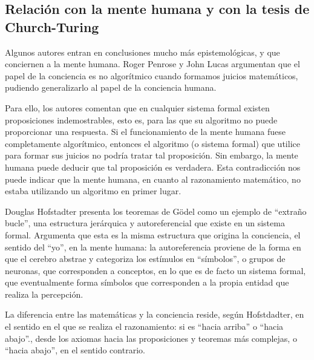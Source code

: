 
\subsection{Relación con la mente humana y con la tesis de Church-Turing}\label{subsec:mente-humana-tesis-church-turing}

Algunos autores entran en conclusiones mucho más epistemológicas, y que conciernen a la mente humana. Roger Penrose y John Lucas \cite{Penrose1989, Lucas1961} argumentan que el papel de la conciencia es no algorítmico cuando formamos juicios matemáticos, pudiendo generalizarlo al papel de la conciencia humana.

Para ello, los autores comentan que en cualquier sistema formal existen proposiciones indemostrables, esto es, para las que su algoritmo no puede proporcionar una respuesta. Si el funcionamiento de la mente humana fuese completamente algorítmico, entonces el algoritmo (o sistema formal) que utilice para formar sus juicios no podría tratar tal proposición. Sin embargo, la mente humana puede deducir que tal proposición es verdadera. Esta contradicción nos puede indicar que la mente humana, en cuanto al razonamiento matemático, no estaba utilizando un algoritmo en primer lugar.

Douglas Hofstadter \cite{Hofstadter1999, Hofstadter2007} presenta los teoremas de Gödel como un ejemplo de ``extraño bucle'', una estructura jerárquica y autoreferencial que existe en un sistema formal. Argumenta que esta es la misma estructura que origina la conciencia, el sentido del ``yo'', en la mente humana: la autoreferencia proviene de la forma en que el cerebro abstrae y categoriza los estímulos en ``símbolos'', o grupos de neuronas, que corresponden a conceptos, en lo que es de facto un sistema formal, que eventualmente forma símbolos que corresponden a la propia entidad que realiza la percepción. 

La diferencia entre las matemáticas y la conciencia reside, según Hofstdadter, en el sentido en el que se realiza el razonamiento: si es ``hacia arriba'' o ``hacia abajo''., desde los axiomas hacia las proposiciones y teoremas más complejas, o ``hacia abajo'', en el sentido contrario.

